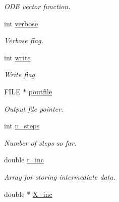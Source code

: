 \begin{DoxyCompactItemize}
\begin{DoxyCompactList}\small\item\em O\+D\+E vector function. \end{DoxyCompactList}\item 
\hypertarget{structfweuler_a71969341520cf6b76abcc298471743da}{}int \hyperlink{structfweuler_a71969341520cf6b76abcc298471743da}{verbose}\label{structfweuler_a71969341520cf6b76abcc298471743da}

\begin{DoxyCompactList}\small\item\em Verbose flag. \end{DoxyCompactList}\item 
\hypertarget{structfweuler_a6f9c2735d7a016c50a343b17cde41d5d}{}int \hyperlink{structfweuler_a6f9c2735d7a016c50a343b17cde41d5d}{write}\label{structfweuler_a6f9c2735d7a016c50a343b17cde41d5d}

\begin{DoxyCompactList}\small\item\em Write flag. \end{DoxyCompactList}\item 
\hypertarget{structfweuler_ad2d6e50980d4a77a79652527c36d03ab}{}F\+I\+L\+E $\ast$ \hyperlink{structfweuler_ad2d6e50980d4a77a79652527c36d03ab}{poutfile}\label{structfweuler_ad2d6e50980d4a77a79652527c36d03ab}

\begin{DoxyCompactList}\small\item\em Output file pointer. \end{DoxyCompactList}\item 
\hypertarget{structfweuler_a3ed5377d7609cbeef32422ad5662ab62}{}int \hyperlink{structfweuler_a3ed5377d7609cbeef32422ad5662ab62}{n\+\_\+steps}\label{structfweuler_a3ed5377d7609cbeef32422ad5662ab62}

\begin{DoxyCompactList}\small\item\em Number of steps so far. \end{DoxyCompactList}\item 
\hypertarget{structfweuler_a24bbdf908ad0e3997194b2f9901a93e4}{}double \hyperlink{structfweuler_a24bbdf908ad0e3997194b2f9901a93e4}{t\+\_\+inc}\label{structfweuler_a24bbdf908ad0e3997194b2f9901a93e4}

\begin{DoxyCompactList}\small\item\em Array for storing intermediate data. \end{DoxyCompactList}\item 
\hypertarget{structfweuler_abb379c1efee260436de2484366a53c47}{}double $\ast$ \hyperlink{structfweuler_abb379c1efee260436de2484366a53c47}{X\+\_\+inc}\label{structfweuler_abb379c1efee260436de2484366a53c47}


\end{DoxyCompactItemize}
